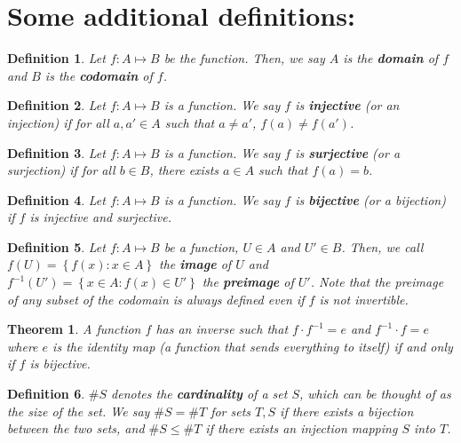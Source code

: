 \documentclass[letterpaper,12pt]{article}
\newcommand{\set}[1]{\left\{ #1 \right\}}
\newtheorem{theorem}{Theorem}[section]
\newtheorem{definition}{Definition}[section]
\begin{document}
\section*{Some additional definitions:}
\begin{definition}
    Let $f:A \mapsto B$ be the function. Then, we say $A$ is the \textbf{domain} of $f$ and $B$ is the \textbf{codomain} of $f$.
\end{definition}
\begin{definition}
    Let $f:A \mapsto B$ is a function. We say $f$ is \textbf{injective} (or an injection) if for all $a,a' \in A$ such that $a \neq a'$, $f(a) \neq f(a')$.
\end{definition}
\begin{definition}
      Let $f:A \mapsto B$ is a function. We say $f$ is \textbf{surjective} (or a surjection) if for all $b \in B$, there exists $a \in A$ such that $f(a) = b$.
\end{definition}
\begin{definition}
     Let $f:A \mapsto B$ is a function. We say $f$ is \textbf{bijective} (or a bijection) if $f$ is injective and surjective.
\end{definition}
\begin{definition}
    Let $f:A \mapsto B$ be a function, $U \in A$ and $U' \in B$. Then, we call $f(U) = \set{f(x):x \in A}$ the \textbf{image} of $U$ and $f^{-1}(U') = \set{x \in A : f(x) \in U'}$ the \textbf{preimage} of $U'$. Note that the preimage of any subset of the codomain is always defined even if $f$ is not invertible.
\end{definition}
\begin{theorem}
    A function $f$ has an inverse such that $f\cdot f^{-1} = e$ and $f^{-1} \cdot f = e$ where $e$ is the identity map (a function that sends everything to itself) if and only if $f$ is bijective.
\end{theorem}
\begin{definition}
    $\# S$ denotes the \textbf{cardinality} of a set $S$, which can be thought of as the size of the set. We say $\# S = \# T$ for sets $T,S$ if there exists a bijection between the two sets, and $\#S \leq \#T$ if there exists an injection mapping $S$ into $T$.
\end{definition}
\end{document}
